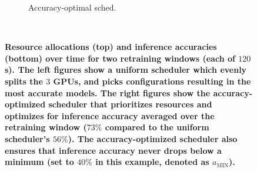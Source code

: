 \begin{figure}[t]
\begin{subfigure}[t]{0.47\columnwidth}
    \caption{\small Accuracy-optimal sched.}
    \label{fig:schedmot-prioritization}
  \end{subfigure}
  ~~
  \caption{\bf\small Resource allocations (top) and inference accuracies (bottom) over time for two retraining windows (each of $120$s). The left figures show a uniform scheduler which evenly splits the $3$ GPUs, and picks configurations resulting in the most accurate models. The right figures show the accuracy-optimized scheduler that prioritizes resources and optimizes for inference accuracy averaged over the retraining window ($73\%$ compared to the uniform scheduler's $56\%$). The accuracy-optimized scheduler also ensures that inference accuracy never drops below a minimum (set to $40\%$ in this example, denoted as $a_\text{MIN}$). %
  }
  \label{fig:schedmot}
\end{figure}


